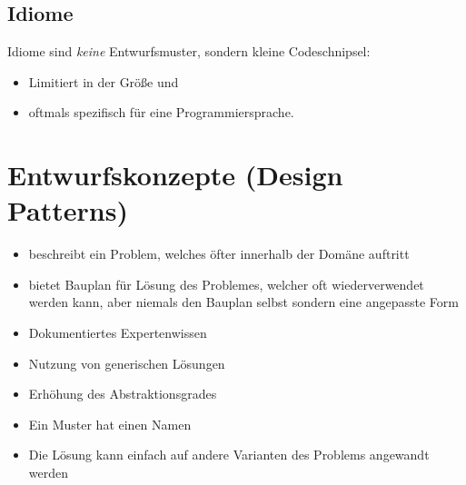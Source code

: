 \documentclass[
    ngerman,
    color=3b,
    summary,
    boxarc,
    main,
]{rubos-tuda-template}
\begin{document}
\subsection{Idiome}
Idiome sind \textit{keine} Entwurfsmuster, sondern kleine Codeschnipsel:
\begin{itemize}
    \item Limitiert in der Größe und
    \item oftmals spezifisch für eine Programmiersprache.
\end{itemize}


\clearpage
\section{Entwurfskonzepte (Design Patterns)}
\begin{definition}\mbox{}
    \begin{itemize}
        \item beschreibt ein Problem, welches öfter innerhalb der Domäne auftritt
        \item bietet Bauplan für Lösung des Problemes, welcher oft wiederverwendet werden kann, aber niemals den Bauplan selbst sondern eine angepasste Form
    \end{itemize}
\end{definition}
\begin{itemize}
    \item Dokumentiertes Expertenwissen
    \item Nutzung von generischen Lösungen
    \item Erhöhung des Abstraktionsgrades
    \item Ein Muster hat einen Namen
    \item Die Lösung kann einfach auf andere Varianten des Problems angewandt werden
\end{itemize}
\end{document}
